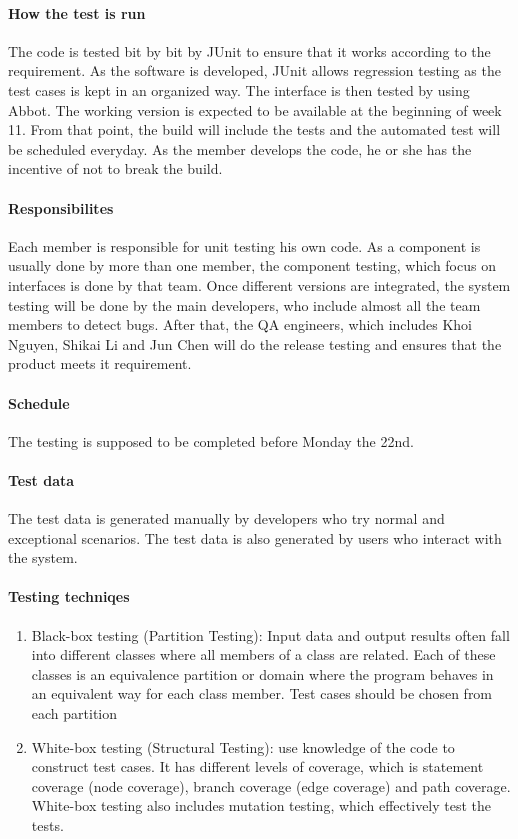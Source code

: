 \documentclass[11pt, a4paper]{report}
\begin{document}
\paragraph{How the test is run}
The code is tested bit by bit by JUnit to ensure that it works according to the requirement. As the software is developed, JUnit allows regression testing as the test cases is kept in an organized way.  The interface is then tested by using Abbot. The working version is expected to be available at the beginning of week 11. From that point, the build will include the tests and the automated test will be scheduled everyday. As the member develops the code, he or she has the incentive of not to break the build.   
\paragraph{Responsibilites}
Each member is responsible for unit testing his own code. As a component is usually done by more than one member, the component testing, which focus on interfaces is done by that team. Once different versions are integrated, the system testing will be done by the main developers, who include almost all the team members to detect bugs. After that, the QA engineers, which includes Khoi Nguyen, Shikai Li and Jun Chen will do the release testing and ensures that the product meets it requirement.
\paragraph{Schedule}
The testing is supposed to be completed before Monday the 22nd.
\paragraph{Test data}
The test data is generated manually by developers who try normal and exceptional scenarios. The test data is also generated by users who interact with the system.
\paragraph{Testing techniqes}
\begin{enumerate}
  \item Black-box testing (Partition Testing): Input data and output results often fall into different classes where all members of a class are related. Each of these classes is an equivalence partition or domain where the program behaves in an equivalent way for each class member.  Test cases should be chosen from each partition
	\item White-box testing (Structural Testing): use knowledge of the code to construct test cases. It has different levels of coverage, which is statement coverage (node coverage), branch coverage (edge coverage) and path coverage. White-box testing also includes mutation testing, which effectively test the tests.	
\end{enumerate}
\pagebreak
\end{document}
